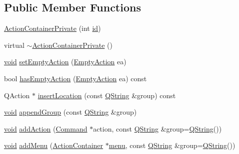 \subsection*{\-Public \-Member \-Functions}
\begin{DoxyCompactItemize}
\item 
\hyperlink{group___core_plugin_ga52f85042d81d941ff4ac9b051f397eeb}{\-Action\-Container\-Private} (int \hyperlink{group___core_plugin_ga394d3161befa5e1f84cf07253b21a536}{id})
\item 
virtual \hyperlink{group___core_plugin_ga34f1b550ba50b544b5a9b8c55ab7d9d1}{$\sim$\-Action\-Container\-Private} ()
\item 
\hyperlink{group___u_a_v_objects_plugin_ga444cf2ff3f0ecbe028adce838d373f5c}{void} \hyperlink{group___core_plugin_gaa38318117b2644daea6897b102055a8f}{set\-Empty\-Action} (\hyperlink{group___core_plugin_ga25957afb898f645827d8e7949c831327}{\-Empty\-Action} ea)
\item 
bool \hyperlink{group___core_plugin_ga16fba98ce7f8879392e66d2091e2b67e}{has\-Empty\-Action} (\hyperlink{group___core_plugin_ga25957afb898f645827d8e7949c831327}{\-Empty\-Action} ea) const 
\item 
\-Q\-Action $\ast$ \hyperlink{group___core_plugin_ga7f3d7f6e914a516890183d6135161cec}{insert\-Location} (const \hyperlink{group___u_a_v_objects_plugin_gab9d252f49c333c94a72f97ce3105a32d}{\-Q\-String} \&group) const 
\item 
\hyperlink{group___u_a_v_objects_plugin_ga444cf2ff3f0ecbe028adce838d373f5c}{void} \hyperlink{group___core_plugin_ga3bc2b8884a63451e9e7bfc1556cb78fd}{append\-Group} (const \hyperlink{group___u_a_v_objects_plugin_gab9d252f49c333c94a72f97ce3105a32d}{\-Q\-String} \&group)
\item 
\hyperlink{group___u_a_v_objects_plugin_ga444cf2ff3f0ecbe028adce838d373f5c}{void} \hyperlink{group___core_plugin_ga9ca5ea32ad53e24a2086f781e5677f1c}{add\-Action} (\hyperlink{class_core_1_1_command}{\-Command} $\ast$action, const \hyperlink{group___u_a_v_objects_plugin_gab9d252f49c333c94a72f97ce3105a32d}{\-Q\-String} \&group=\hyperlink{group___u_a_v_objects_plugin_gab9d252f49c333c94a72f97ce3105a32d}{\-Q\-String}())
\item 
\hyperlink{group___u_a_v_objects_plugin_ga444cf2ff3f0ecbe028adce838d373f5c}{void} \hyperlink{group___core_plugin_ga90d26d7f9b3ba4fe2e1bf088b861c0e0}{add\-Menu} (\hyperlink{class_core_1_1_action_container}{\-Action\-Container} $\ast$\hyperlink{group___core_plugin_ga243949a2b2abff30862e34f6313f28c0}{menu}, const \hyperlink{group___u_a_v_objects_plugin_gab9d252f49c333c94a72f97ce3105a32d}{\-Q\-String} \&group=\hyperlink{group___u_a_v_objects_plugin_gab9d252f49c333c94a72f97ce3105a32d}{\-Q\-String}())

\end{DoxyCompactItemize}
